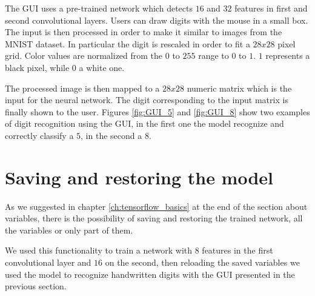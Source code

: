 The \acs{GUI} uses a pre-trained network which detects $16$ and $32$ features in first and second convolutional layers. Users can draw digits with the mouse in a small box. The input is then processed in order to make it similar to images from the \acs{MNIST} dataset. In particular the digit is rescaled in order to fit a $28x28$ pixel grid. Color values are normalized from the $0$ to $255$ range to $0$ to $1$. $1$ represents a black pixel, while $0$ a white one.

The processed image is then mapped to a $28x28$ numeric matrix which is the input for the neural network. The digit corresponding to the input matrix is finally shown to the user. Figures \ref{fig:GUI_5} and \ref{fig:GUI_8} show two examples of digit recognition using the \acs{GUI}, in the first one the model recognize and correctly classify a $5$, in the second a $8$.

\section{Saving and restoring the model}

As we suggested in chapter \ref{ch:tensorflow_basics} at the end of the section about variables, there is the possibility of saving and restoring the trained network, all the variables or only part of them.

We used this functionality to train a network with $8$ features in the first convolutional layer and $16$ on the second, then reloading the saved variables we used the model to recognize handwritten digits with the \acs{GUI} presented in the previous section.